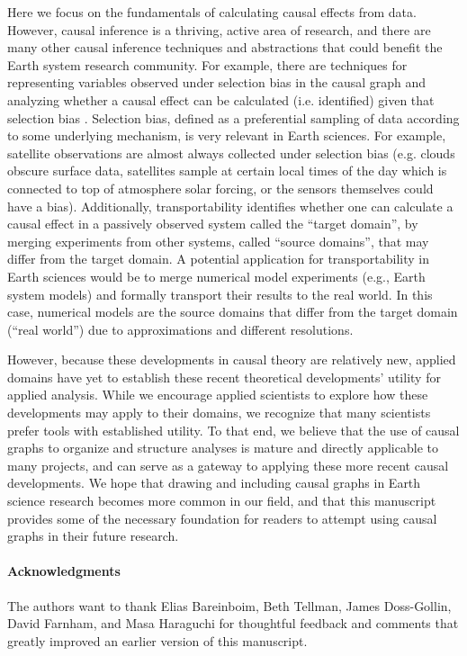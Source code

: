 \documentclass[12pt]{article}
\begin{document}
Here we focus on the fundamentals of calculating causal effects from
data. However, causal inference is a thriving, active area of
research, and there are many other causal inference techniques and
abstractions that could benefit the Earth system research
community. For example, there are techniques for representing
variables observed under selection bias in the causal graph and
analyzing whether a causal effect can be calculated (i.e. identified)
given that selection bias
\citep[e.g.,][]{bareinboim2014recovering,correa2018generalized}. Selection
bias, defined as a preferential sampling of data according to some
underlying mechanism, is very relevant in Earth sciences. For example,
satellite observations are almost always collected under selection
bias (e.g. clouds obscure surface data, satellites sample at certain
local times of the day which is connected to top of atmosphere solar
forcing, or the sensors themselves could have a bias). Additionally,
transportability
\citep[e.g.,][]{bareinboim2012transportability,Bareinboim7345,lee2019general}
identifies whether one can calculate a causal effect in a passively
observed system called the ``target domain'', by merging experiments
from other systems, called ``source domains'', that may differ from
the target domain. A potential application for transportability in
Earth sciences would be to merge numerical model experiments (e.g.,
Earth system models) and formally transport their results to the real
world. In this case, numerical models are the source domains that
differ from the target domain (``real world'') due to approximations
and different resolutions.

However, because these developments in causal theory are relatively
new, applied domains have yet to establish these recent theoretical
developments' utility for applied analysis. While we encourage applied
scientists to explore how these developments may apply to their
domains, we recognize that many scientists prefer tools with
established utility. To that end, we believe that the use of causal
graphs to organize and structure analyses is mature and directly
applicable to many projects, and can serve as a gateway to applying
these more recent causal developments. We hope that drawing and
including causal graphs in Earth science research becomes more common
in our field, and that this manuscript provides some of the necessary
foundation for readers to attempt using causal graphs in their future
research.

\paragraph{Acknowledgments} The authors want to thank Elias
Bareinboim, Beth Tellman, James Doss-Gollin, David Farnham, and Masa
Haraguchi for thoughtful feedback and comments that greatly improved
an earlier version of this manuscript.
\end{document}
